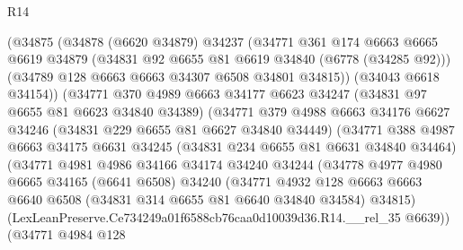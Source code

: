\begin{lexlean}{R14}
\begin{coremodule}
                    (@34875
                      (@34878
                        (@6620 @34879)
                        @34237
                        (@34771
                          @361
                          @174
                          @6663
                          @6665
                          @6619
                          @34879
                          (@34831 @92 @6655 @81 @6619 @34840 (@6778 (@34285 @92)))
                          (@34789 @128 @6663 @6663 @34307 @6508 @34801 @34815))
                        (@34043 @6618 @34154))
                      (@34771
                        @370
                        @4989
                        @6663
                        @34177
                        @6623
                        @34247
                        (@34831 @97 @6655 @81 @6623 @34840 @34389)
                        (@34771
                          @379
                          @4988
                          @6663
                          @34176
                          @6627
                          @34246
                          (@34831 @229 @6655 @81 @6627 @34840 @34449)
                          (@34771
                            @388
                            @4987
                            @6663
                            @34175
                            @6631
                            @34245
                            (@34831 @234 @6655 @81 @6631 @34840 @34464)
                            (@34771
                              @4981
                              @4986
                              @34166
                              @34174
                              @34240
                              @34244
                              (@34778
                                @4977
                                @4980
                                @6665
                                @34165
                                (@6641 @6508)
                                @34240
                                (@34771
                                  @4932
                                  @128
                                  @6663
                                  @6663
                                  @6640
                                  @6508
                                  (@34831 @314 @6655 @81 @6640 @34840 @34584)
                                  @34815)
                                (LexLeanPreserve.Ce734249a01f6588cb76caa0d10039d36.R14.__rel_35
                                  @6639))
                              (@34771
                                @4984
                                @128

\end{coremodule}
\end{lexlean}
